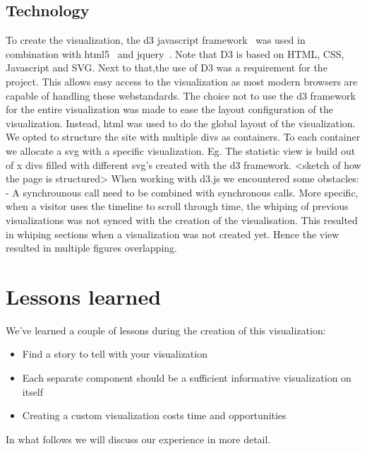 \documentclass{sigchi}
\begin{document}
\subsection{Technology}
To create the visualization, the d3 javascript framework~\cite{d3.js} was used in combination with html5~\cite{html5} and jquery~\cite{jquery}.  Note that D3 is based on HTML, CSS, Javascript and SVG.
Next to that,the use of D3 was a requirement for the project. This allows easy
access to the visualization as most modern browsers are capable of handling
these webstandards. 
The choice not to use the d3 framework for the entire visualization was made to
ease the layout configuration of the visualization. Instead, html was used to do
the global layout of the visualization. We opted to structure the site with multiple
divs as containers. To each container we allocate a svg with a specific visualization.
Eg. The statistic view is build out of x divs filled with different svg's created
with the d3 framework.
<sketch of how the page is structured>
When working with d3.js we encountered some obstacles:
- A synchrounous call need to be combined with synchronous calls. More specific, when a visitor uses the timeline to scroll through time, the whiping of previous visualizations was not synced with the creation of the visualisation. This resulted in whiping sections when a visualization was not created yet. Hence the view resulted in multiple figures overlapping.


\section{Lessons learned}\label{sec:discussion}
We've learned a couple of lessons during the creation of this visualization:
\begin{itemize}
    \item Find a story to tell with your visualization
    \item Each separate component should be a sufficient informative visualization on itself
    \item Creating a custom visualization costs time and opportunities
\end{itemize}
In what follows we will discuss our experience in more detail.
\end{document}
